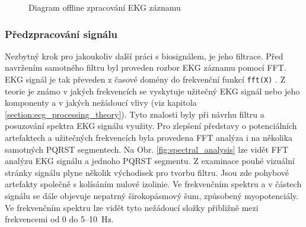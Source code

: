 \begin{figure}[H]
    \centering
    \caption{Diagram offline zpracování EKG záznamu}
    \label{fig:diagram_offline_processing}
\end{figure}

\subsubsection{Předzpracování signálu}
\label{section:preprocessing}
Nezbytný krok pro jakoukoliv další práci s biosignálem, je jeho filtrace. Před
navržením samotného filtru byl proveden rozbor EKG záznamu pomocí FFT. EKG
signál je tak převeden z časové domény do frekvenční funkcí \texttt{fft(X)}
\cite{matlabFFT}. Z teorie je známo v jakých frekvencích se vyskytuje užitečný
EKG signál nebo jeho komponenty a v jakých nežádoucí vlivy (viz kapitola
\ref{section:ecg_processing_theory}). Tyto znalosti byly při návrhu filtru a
posuzování spektra EKG signálu využity. Pro zlepšení představy o potenciálních
artefaktech a užitečných frekvencích byla provedena FFT analýza i na několika
samotných PQRST segmentech. Na Obr. \ref{fig:spectral_analysis} lze vidět FFT
analýzu EKG signálu a jednoho PQRST segmentu. Z examinace pouhé vizuální stránky
signálu plyne několik východisek pro tvorbu filtru. Jsou zde pohybové artefakty
společně s kolísáním nulové izolinie. Ve frekvenčním spektru a v částech signálu
se dále objevuje nepatrný širokopásmový šum, způsobený myopotenciály. Ve
frekvenčním spektru lze vidět tyto nežádoucí složky přibližně mezi frekvencemi
od 0 do 5--10~\si\Hz.

